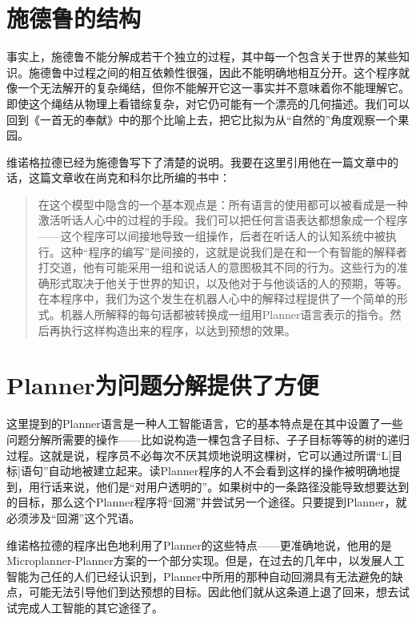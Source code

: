 \section{施德鲁的结构}

事实上，施德鲁不能分解成若干个独立的过程，其中每一个包含关于世界的某些知识。施德鲁中过程之间的相互依赖性很强，因此不能明确地相互分开。这个程序就像一个无法解开的复杂绳结，但你不能解开它这一事实并不意味着你不能理解它。即使这个绳结从物理上看错综复杂，对它仍可能有一个漂亮的几何描述。我们可以回到《一首无的奉献》中的那个比喻上去，把它比拟为从“自然的”角度观察一个果园。

维诺格拉德已经为施德鲁写下了清楚的说明。我要在这里引用他在一篇文章中的话，这篇文章收在尚克和科尔比所编的书中：

\begin{quote}
在这个模型中隐含的一个基本观点是：所有语言的使用都可以被看成是一种激活听话人心中的过程的手段。我们可以把任何言语表达都想象成一个程序——这个程序可以间接地导致一组操作，后者在听话人的认知系统中被执行。这种“程序的编写”是间接的，这就是说我们是在和一个有智能的解释者打交道，他有可能采用一组和说话人的意图极其不同的行为。这些行为的准确形式取决于他关于世界的知识，以及他对于与他谈话的人的预期，等等。在本程序中，我们为这个发生在机器人心中的解释过程提供了一个简单的形式。机器人所解释的每句话都被转换成一组用Planner语言表示的指令。然后再执行这样构造出来的程序，以达到预想的效果。
\end{quote}

\section{Planner为问题分解提供了方便}

这里提到的Planner语言是一种人工智能语言，它的基本特点是在其中设置了一些问题分解所需要的操作——比如说构造一棵包含子目标、子子目标等等的树的递归过程。这就是说，程序员不必每次不厌其烦地说明这棵树，它可以通过所谓“L[目标]语句”自动地被建立起来。读Planner程序的人不会看到这样的操作被明确地提到，用行话来说，他们是“对用户透明的”。如果树中的一条路径没能导致想要达到的目标，那么这个Planner程序将“回溯”并尝试另一个途径。只要提到Planner，就必须涉及“回溯”这个咒语。

维诺格拉德的程序出色地利用了Planner的这些特点——更准确地说，他用的是Microplanner-Planner方案的一个部分实现。但是，在过去的几年中，以发展人工智能为己任的人们已经认识到，Planner中所用的那种自动回溯具有无法避免的缺点，可能无法引导他们到达预想的目标。因此他们就从这条道上退了回来，想去试试完成人工智能的其它途径了。

